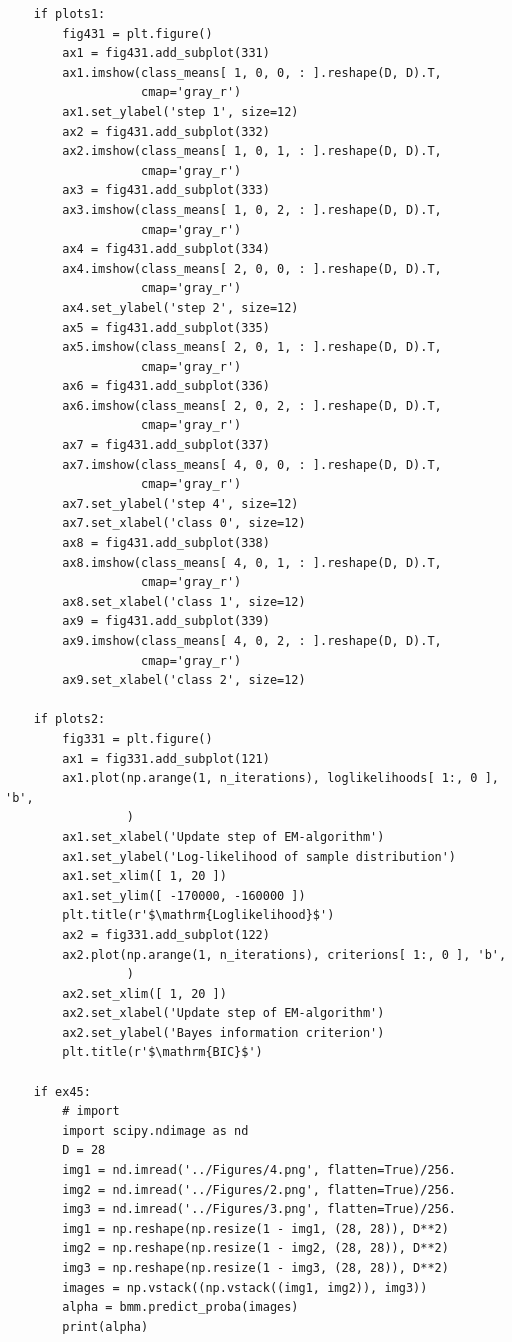 \begin{verbatim}
    if plots1:
        fig431 = plt.figure()
        ax1 = fig431.add_subplot(331)
        ax1.imshow(class_means[ 1, 0, 0, : ].reshape(D, D).T,
                   cmap='gray_r')
        ax1.set_ylabel('step 1', size=12)
        ax2 = fig431.add_subplot(332)
        ax2.imshow(class_means[ 1, 0, 1, : ].reshape(D, D).T,
                   cmap='gray_r')
        ax3 = fig431.add_subplot(333)
        ax3.imshow(class_means[ 1, 0, 2, : ].reshape(D, D).T,
                   cmap='gray_r')
        ax4 = fig431.add_subplot(334)
        ax4.imshow(class_means[ 2, 0, 0, : ].reshape(D, D).T,
                   cmap='gray_r')
        ax4.set_ylabel('step 2', size=12)
        ax5 = fig431.add_subplot(335)
        ax5.imshow(class_means[ 2, 0, 1, : ].reshape(D, D).T,
                   cmap='gray_r')
        ax6 = fig431.add_subplot(336)
        ax6.imshow(class_means[ 2, 0, 2, : ].reshape(D, D).T,
                   cmap='gray_r')
        ax7 = fig431.add_subplot(337)
        ax7.imshow(class_means[ 4, 0, 0, : ].reshape(D, D).T,
                   cmap='gray_r')
        ax7.set_ylabel('step 4', size=12)
        ax7.set_xlabel('class 0', size=12)
        ax8 = fig431.add_subplot(338)
        ax8.imshow(class_means[ 4, 0, 1, : ].reshape(D, D).T,
                   cmap='gray_r')
        ax8.set_xlabel('class 1', size=12)
        ax9 = fig431.add_subplot(339)
        ax9.imshow(class_means[ 4, 0, 2, : ].reshape(D, D).T,
                   cmap='gray_r')
        ax9.set_xlabel('class 2', size=12)

    if plots2:
        fig331 = plt.figure()
        ax1 = fig331.add_subplot(121)
        ax1.plot(np.arange(1, n_iterations), loglikelihoods[ 1:, 0 ], 'b',
                 )
        ax1.set_xlabel('Update step of EM-algorithm')
        ax1.set_ylabel('Log-likelihood of sample distribution')
        ax1.set_xlim([ 1, 20 ])
        ax1.set_ylim([ -170000, -160000 ])
        plt.title(r'$\mathrm{Loglikelihood}$')
        ax2 = fig331.add_subplot(122)
        ax2.plot(np.arange(1, n_iterations), criterions[ 1:, 0 ], 'b',
                 )
        ax2.set_xlim([ 1, 20 ])
        ax2.set_xlabel('Update step of EM-algorithm')
        ax2.set_ylabel('Bayes information criterion')
        plt.title(r'$\mathrm{BIC}$')

    if ex45:
        # import
        import scipy.ndimage as nd
        D = 28
        img1 = nd.imread('../Figures/4.png', flatten=True)/256.
        img2 = nd.imread('../Figures/2.png', flatten=True)/256.
        img3 = nd.imread('../Figures/3.png', flatten=True)/256.
        img1 = np.reshape(np.resize(1 - img1, (28, 28)), D**2)
        img2 = np.reshape(np.resize(1 - img2, (28, 28)), D**2)
        img3 = np.reshape(np.resize(1 - img3, (28, 28)), D**2)
        images = np.vstack((np.vstack((img1, img2)), img3))
        alpha = bmm.predict_proba(images)
        print(alpha)


\end{verbatim}
